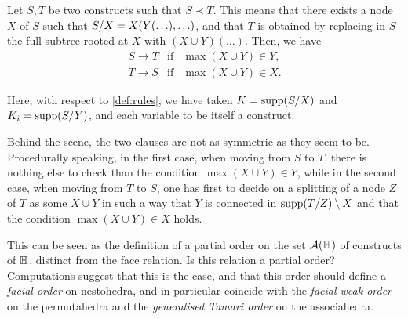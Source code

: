 \begin{definition} 
  Let $S,T$ be two constructs such that $S \prec T$. 
  This means that there exists a node $X$ of $S$ such that $S/X=X(Y(\ldots),\ldots)$, and that $T$ is obtained by replacing in $S$ the full subtree rooted at $X$ with $(X\cup Y)(\ldots)$. 
  Then, we have
  $$\begin{array}{lll}
    S \to T &  \mathrm{if} & \max(X\cup Y)\in Y, \\
    T \to S & \mathrm{if} & \max(X\cup Y)\in X.
  \end{array}$$
\end{definition} 

Here, with respect to \cref{def:rules}, we have taken $K=\operatorname{supp}(S/X)$ and $K_i=\operatorname{supp}(S/Y)$, and each variable to be itself a construct.


\begin{rem}
  Behind the scene, the two clauses are not as symmetric as they seem to be. 
  Procedurally speaking, in the first case, when moving from $S$ to $T$, there is nothing else to check than the condition $\max(X\cup Y)\in Y$, while in the second case, when moving from $T$ to $S$, one has first to decide on a splitting of a node $Z$ of $T$ as some $X\cup Y$ in such a way that $Y$ is connected in $\operatorname{supp}(T/Z)\setminus X$ and  that  the condition $\max(X\cup Y)\in X$ holds.
\end{rem}

\begin{rem}
  This can be seen as the definition of a partial order on the set $\mathcal{A}({\mathbb H})$ of constructs of ${\mathbb H}$, distinct from the face relation. 
  Is this relation a partial order?
  Computations suggest that this is the case, and that this order should define a \emph{facial order} on nestohedra, and in particular coincide with the \emph{facial weak order} \cite{KrobLatapyNovelliPhanSchwer,PalaciosRonco,DermenjianHohlwegPilaud} on the permutahedra and the \emph{generalised Tamari order} \cite{Ronco12} on the associahedra.
\end{rem}



